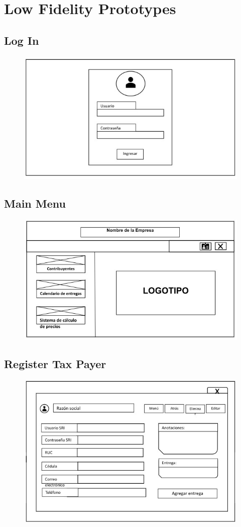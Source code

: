 \documentclass[a4paper,12pt,numbers=noenddot]{scrreprt} %
\begin{document}
\chapter{Low Fidelity Prototypes} 

\section{Log In}
\begin{figure}[H] 
    \centering
    \includegraphics[width=0.75\linewidth]{lowfidelityprototype/login.jpeg}
\end{figure}
\section{Main Menu}
\begin{figure}[H] 
    \centering
    \includegraphics[width=0.75\linewidth]{lowfidelityprototype/mainmenu.jpeg}
\end{figure}
\section{Register Tax Payer}
\begin{figure}[H] 
    \centering
    \includegraphics[width=0.75\linewidth]{lowfidelityprototype/addtaxpayer.jpeg}
\end{figure}
\end{document}
